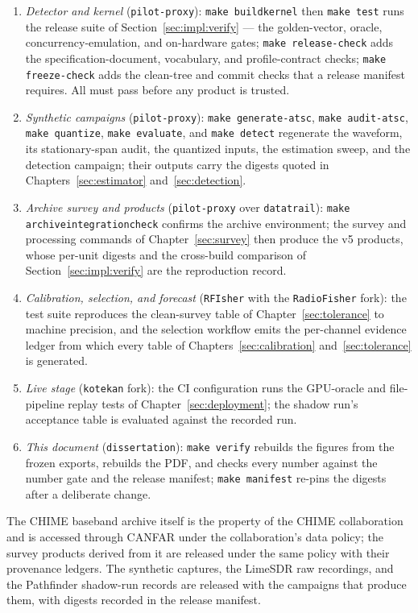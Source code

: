 \begin{enumerate}[leftmargin=2em,itemsep=2pt]
\item \emph{Detector and kernel} (\texttt{pilot-proxy}): \texttt{make build\-kernel}
then \texttt{make test} runs the release suite of Section~\ref{sec:impl:verify}
--- the golden-vector, oracle, concurrency-emulation, and on-hardware gates;
\texttt{make release-check} adds the specification-document, vocabulary, and profile-contract checks; \texttt{make freeze-check} adds the clean-tree and
commit checks that a release manifest requires.  All must pass before any
product is trusted.
\item \emph{Synthetic campaigns} (\texttt{pilot-proxy}): \texttt{make generate-atsc}, 
\texttt{make audit-atsc}, \texttt{make quantize}, \texttt{make evaluate}, and \texttt{make detect} regenerate the waveform, its stationary-span audit, the
quantized inputs, the estimation sweep, and the detection campaign; their
outputs carry the digests quoted in Chapters~\ref{sec:estimator}
and~\ref{sec:detection}.
\item \emph{Archive survey and products} (\texttt{pilot-proxy} over
\texttt{datatrail}): \texttt{make archive\-integration\-check} confirms the
archive environment; the survey and processing commands of
Chapter~\ref{sec:survey} then produce the v5 products, whose per-unit digests
and the cross-build comparison of Section~\ref{sec:impl:verify} are the
reproduction record.
\item \emph{Calibration, selection, and forecast} (\texttt{RFIsher} with the
\texttt{RadioFisher} fork): the test suite reproduces the clean-survey table
of Chapter~\ref{sec:tolerance} to machine precision, and the selection
workflow emits the per-channel evidence ledger from which every table of
Chapters~\ref{sec:calibration} and~\ref{sec:tolerance} is generated.
\item \emph{Live stage} (\texttt{kotekan} fork): the CI configuration runs the
GPU-oracle and file-pipeline replay tests of Chapter~\ref{sec:deployment}; the
shadow run's acceptance table is evaluated against the recorded run.
\item \emph{This document} (\texttt{dissertation}): \texttt{make verify} rebuilds
the figures from the frozen exports, rebuilds the PDF, and checks every number
against the number gate and the release manifest; \texttt{make manifest}
re-pins the digests after a deliberate change.
\end{enumerate}

The CHIME baseband archive itself is the property of the CHIME collaboration
and is accessed through CANFAR under the collaboration's data policy; the
survey products derived from it are released under the same policy with their
provenance ledgers.  The synthetic captures, the LimeSDR raw recordings, and
the Pathfinder shadow-run records are released with the campaigns that produce
them, with digests recorded in the release manifest.

